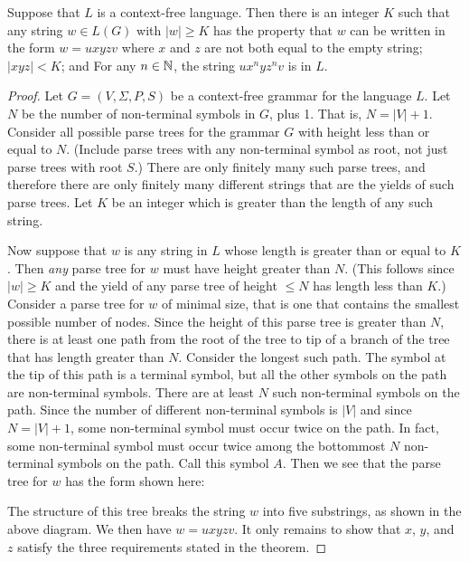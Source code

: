 \begin{theorem}
Suppose that $L$ is a context-free language.
Then there is an integer $K$ such that any string $w\in L(G)$
with $|w|\ge K$ has the property that $w$ can be written
in the form $w=uxyzv$ where
\Item{$\bullet\,$}$x$ and $z$ are not both equal to the empty string;
\Item{$\bullet\,$}$|xyz|< K$; and
\Item{$\bullet\,$}For any $n\in{\mathbb N}$, the string $ux^nyz^nv$ is in $L$.
\end{theorem}
\begin{proof}
Let $G=(V,\Sigma,P,S)$ be a context-free grammar for the language $L$.
Let $N$ be the number of non-terminal symbols in $G$, plus 1.  That is,
$N=|V|+1$.  Consider all possible parse trees for the grammar $G$
with height less than or equal to $N$.  (Include parse trees with any
non-terminal symbol as root, not just parse trees with root $S$.) 
There are only finitely many such parse trees, and therefore there
are only finitely many different strings that are the yields of
such parse trees.  Let $K$ 
be an integer which is greater than the length of any such string.

Now suppose that $w$ is any string in $L$ whose length is greater
than or equal to $K$.  Then \textit{any} parse tree for $w$ must have height
greater than $N$.  (This follows since $|w|\ge K$ and the yield of 
any parse tree of height $\le N$ has length less than $K$.)
Consider a parse tree for $w$ of minimal size, that is one that contains
the smallest possible number of nodes.  Since the height of this parse
tree is greater than $N$, there is at least one path from the
root of the tree to tip of a branch of the tree that has length
greater than $N$.  Consider the longest such path.  The symbol at
the tip of this path is a terminal symbol, but all the other symbols
on the path are non-terminal symbols.  There are at least $N$ such
non-terminal symbols on the path.  Since the number of different
non-terminal symbols is $|V|$ and since $N=|V|+1$, some non-terminal
symbol must occur twice on the path.  In fact, some non-terminal
symbol must occur twice among the bottommost $N$ non-terminal
symbols on the path.  Call this symbol $A$.  Then we see that
the parse tree for $w$ has the form shown here:

\medskip
\centerline{}

\noindent The structure of this tree breaks the string $w$ into
five substrings, as shown in the above diagram.
We then have $w=uxyzv$.  It only remains to show that $x$,
$y$, and $z$ satisfy the three requirements stated in the 
theorem.


\end{proof}
